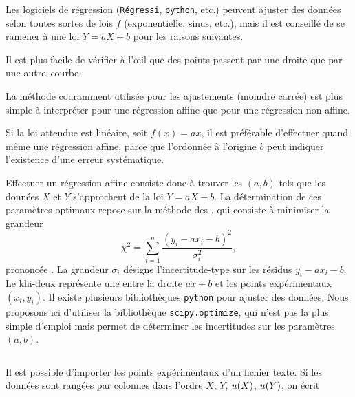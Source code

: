 Les logiciels de régression (\texttt{Régressi}, \texttt{python}, etc.) peuvent ajuster des données selon toutes sortes de lois $f$ (exponentielle, sinus, etc.), mais il est conseillé de se ramener à une loi  $Y=aX+b$ pour les raisons suivantes.
\begin{liste}
\item Il est plus facile de vérifier à l’œil que des points passent par une droite que par une autre~courbe.
\item La méthode couramment utilisée pour les ajustements (moindre carrée) est plus simple à interpréter pour une régression affine  que pour une régression non affine.
\item Si la loi attendue est linéaire, soit $f(x)=ax$, il est préférable d’effectuer quand même une régression affine, parce que l’ordonnée à l’origine $b$ peut indiquer l’existence d’une erreur systématique.

\end{liste}
Effectuer un régression affine consiste donc à trouver les  $(a,b)$ tels que les données $X$ et $Y$ s’approchent de la loi $Y =  aX+b$. La détermination de ces paramètres optimaux repose sur la méthode des , qui consiste à minimiser la grandeur
\begin{equation}
\chi^2 = \sum_{i=1}^n \frac{(y_i-ax_i-b)^2}{\sigma_i^2},
\end{equation}
prononcée . La grandeur $\sigma_i$ désigne l'incertitude-type sur les résidus $y_i-ax_i-b$. Le khi-deux représente une  entre la droite $ax+b$ et les points expérimentaux $(x_i,y_i)$. Il existe plusieurs bibliothèques \texttt{python} pour ajuster des données. Nous proposons ici d’utiliser la bibliothèque \texttt{scipy.optimize}, qui n’est pas la plus simple d’emploi mais permet de déterminer les incertitudes sur les paramètres $(a,b)$.

\inputminted{python}{reg_lin.py}
%

\begin{remarque}
Il est possible d'importer les points expérimentaux d'un fichier texte.
Si les données sont rangées par colonnes dans l'ordre $X$, $Y$, $u(X)$, $u(Y)$, on écrit
\inputminted{python}{import.py}
\end{remarque}

